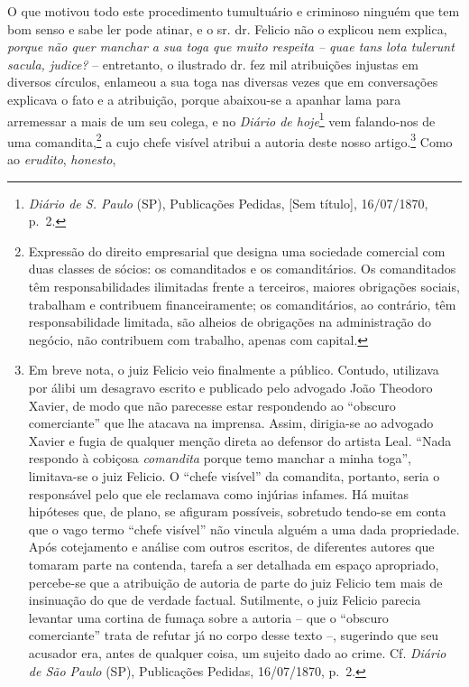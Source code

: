 O que motivou todo este procedimento tumultuário e criminoso ninguém que
tem bom senso e sabe ler pode atinar, e o sr. dr. Felicio não o explicou
nem explica, \emph{porque não quer manchar a sua toga que muito respeita
-- quae tans lota tulerunt sacula, judice?} -- entretanto, o ilustrado
dr. fez mil atribuições injustas em diversos círculos, enlameou a sua
toga nas diversas vezes que em conversações explicava o fato e a
atribuição, porque abaixou-se a apanhar lama para arremessar a mais de
um seu colega, e no \emph{Diário de hoje}\footnote{ \emph{Diário de S.
  Paulo} (SP), Publicações Pedidas, {[}Sem título{]}, 16/07/1870, p.~2.}
vem falando-nos de uma comandita,\footnote{ Expressão do direito
  empresarial que designa uma sociedade comercial com duas classes de
  sócios: os comanditados e os comanditários. Os comanditados têm
  responsabilidades ilimitadas frente a terceiros, maiores obrigações
  sociais, trabalham e contribuem financeiramente; os comanditários, ao
  contrário, têm responsabilidade limitada, são alheios de obrigações na
  administração do negócio, não contribuem com trabalho, apenas com
  capital.} a cujo chefe visível atribui a autoria deste nosso
artigo.\footnote{ Em breve nota, o juiz Felicio veio finalmente a
  público. Contudo, utilizava por álibi um desagravo escrito e publicado
  pelo advogado João Theodoro Xavier, de modo que não parecesse estar
  respondendo ao ``obscuro comerciante'' que lhe atacava na imprensa.
  Assim, dirigia-se ao advogado Xavier e fugia de qualquer menção direta
  ao defensor do artista Leal. ``Nada respondo à cobiçosa
  \emph{comandita} porque temo manchar a minha toga'', limitava-se o juiz
  Felicio. O ``chefe visível'' da comandita, portanto, seria o responsável
  pelo que ele reclamava como injúrias infames. Há muitas hipóteses que,
  de plano, se afiguram possíveis, sobretudo tendo-se em conta que o
  vago termo ``chefe visível'' não vincula alguém a uma dada propriedade.
  Após cotejamento e análise com outros escritos, de diferentes autores
  que tomaram parte na contenda, tarefa a ser detalhada em espaço
  apropriado, percebe-se que a atribuição de autoria de parte do juiz
  Felicio tem mais de insinuação do que de verdade factual. Sutilmente,
  o juiz Felicio parecia levantar uma cortina de fumaça sobre a autoria
  -- que o ``obscuro comerciante'' trata de refutar já no corpo desse
  texto --, sugerindo que seu acusador era, antes de qualquer coisa, um
  sujeito dado ao crime. Cf. \emph{Diário de São Paulo} (SP), Publicações
  Pedidas, 16/07/1870, p.~2.} Como ao \emph{erudito}, \emph{honesto},
